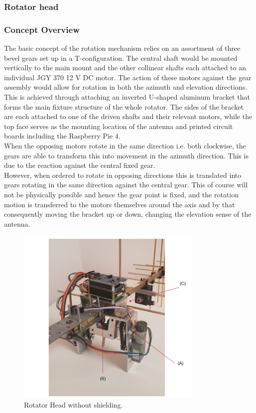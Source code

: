 \subsubsection{Rotator head}
\subsubsection*{Concept Overview}
The basic concept of the rotation mechanism relies on an assortment of three bevel gears set up in a T-configuration. The central shaft would be mounted vertically to the main mount and the other collinear shafts each attached to an individual JGY 370 12 V DC motor. The action of these motors against the gear assembly would allow for rotation in both the azimuth and elevation directions. This is achieved through attaching an inverted U-shaped aluminum bracket that forms the main fixture structure of the whole rotator. The sides of the bracket are each attached to one of the driven shafts and their relevant motors, while the top face serves as the mounting location of the antenna and printed circuit boards including the Raspberry Pie 4.\\
When the opposing motors rotate in the same direction i.e. both clockwise, the gears are able to transform this into movement in the azimuth direction. This is due to the reaction against the central fixed gear.\\
However, when ordered to rotate in opposing directions this is translated into gears rotating in the same direction against the central gear. This of course will not be physically possible and hence the gear point is fixed, and the rotation motion is transferred to the motors themselves around the axis and by that consequently moving the bracket up or down, changing the elevation sense of the antenna.

\begin{figure}[H]
	\centering
	\includegraphics[width=0.8\textwidth]{../art/Pic1Head.png}
	\caption{Rotator Head without shielding.}
\end{figure}

